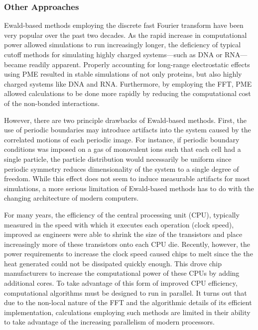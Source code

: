 \subsubsection{Other Approaches}

Ewald-based methods employing the discrete fast Fourier transform have been very
popular over the past two decades. As the rapid increase in computational power
allowed simulations to run increasingly longer, the deficiency of typical cutoff
methods for simulating highly charged systems---such as DNA or RNA---became
readily apparent. \cite{Miaskiewicz_JAmChemSoc_1993_v115_p1526,
McConnell_JAmChemSoc_1994_v116_p4461} Properly accounting for long-range
electrostatic effects using PME resulted in stable simulations of not only
proteins, but also highly charged systems like DNA and RNA.
\cite{Cheatham_JAmChemSoc_1995_v117_p4193} Furthermore, by employing the FFT,
PME allowed calculations to be done more rapidly by reducing the computational
cost of the non-bonded interactions.

However, there are two principle drawbacks of Ewald-based methods. First, the
use of periodic boundaries may introduce artifacts into the system caused by the
correlated motions of each periodic image.
\cite{Hunenberger_JChemPhys_1999_v110_p1856} For instance, if periodic boundary
conditions was imposed on a gas of monovalent ions such that each cell had a
single particle, the particle distribution would necessarily be uniform since
periodic symmetry reduces dimensionality of the system to a single degree of
freedom.  While this effect does not seem to induce measurable artifacts for
most simulations, \cite{Hunenberger_JChemPhys_1999_v110_p1856} a more serious
limitation of Ewald-based methods has to do with the changing architecture of
modern computers.

For many years, the efficiency of the central processing unit (CPU), typically
measured in the speed with which it executes each operation (\ie clock speed),
improved as engineers were able to shrink the size of the transistors and place
increasingly more of these transistors onto each CPU die. Recently, however, the
power requirements to increase the clock speed caused chips to melt since the
the heat generated could not be dissipated quickly enough. This drove chip
manufacturers to increase the computational power of these CPUs by adding
additional cores. To take advantage of this form of improved CPU efficiency,
computational algorithms must be designed to run in parallel. It turns out that
due to the non-local nature of the FFT and the algorithmic details of its
efficient implementation, calculations employing such methods are limited in
their ability to take advantage of the increasing parallelism of modern
processors.

